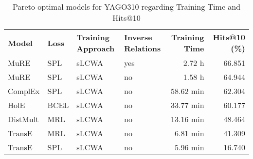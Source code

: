\begin{table}[H]
\centering
\caption{Pareto-optimal models for YAGO310 regarding Training Time and Hits@10}
\label{tab:skyline_yago310_training_time}
\begin{tabular}{llllrr}
\toprule
   Model & Loss & Training Approach & Inverse Relations & Training Time &  Hits@10 (\%) \\
\midrule
    MuRE &  SPL &             sLCWA &               yes &        2.72 h &       66.851 \\
    MuRE &  SPL &             sLCWA &                no &        1.58 h &       64.944 \\
 ComplEx &  SPL &             sLCWA &                no &     58.62 min &       62.304 \\
    HolE & BCEL &             sLCWA &                no &     33.77 min &       60.177 \\
DistMult &  MRL &             sLCWA &                no &     13.16 min &       48.464 \\
  TransE &  MRL &             sLCWA &                no &      6.81 min &       41.309 \\
  TransE &  SPL &             sLCWA &                no &      5.96 min &       16.740 \\
\bottomrule
\end{tabular}
\end{table}

